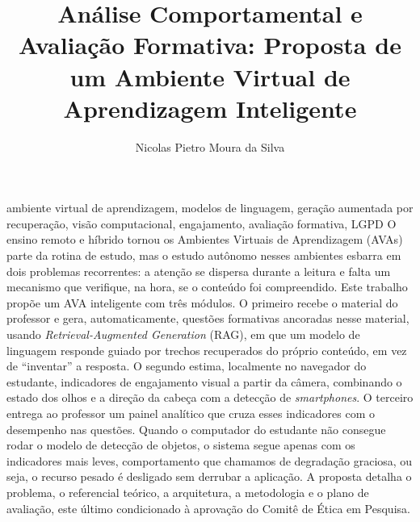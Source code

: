 \documentclass[portuguese,oneside]{tcc}
\author{Nicolas Pietro Moura da Silva}
\title{Análise Comportamental e Avaliação Formativa: Proposta de um Ambiente Virtual de Aprendizagem Inteligente}
      {Behavioural Analysis and Formative Assessment: A Proposal for an Intelligent Virtual Learning Environment}
\begin{document}

\begin{resumo}{ambiente virtual de aprendizagem, modelos de linguagem, geração aumentada por recuperação, visão computacional, engajamento, avaliação formativa, LGPD}
O ensino remoto e híbrido tornou os Ambientes Virtuais de Aprendizagem (AVAs) parte da rotina de estudo, mas o estudo autônomo nesses ambientes esbarra em dois problemas recorrentes: a atenção se dispersa durante a leitura e falta um mecanismo que verifique, na hora, se o conteúdo foi compreendido. Este trabalho propõe um AVA inteligente com três módulos. O primeiro recebe o material do professor e gera, automaticamente, questões formativas ancoradas nesse material, usando \emph{Retrieval-Augmented Generation} (RAG), em que um modelo de linguagem responde guiado por trechos recuperados do próprio conteúdo, em vez de ``inventar'' a resposta. O segundo estima, localmente no navegador do estudante, indicadores de engajamento visual a partir da câmera, combinando o estado dos olhos e a direção da cabeça com a detecção de \emph{smartphones}. O terceiro entrega ao professor um painel analítico que cruza esses indicadores com o desempenho nas questões. Quando o computador do estudante não consegue rodar o modelo de detecção de objetos, o sistema segue apenas com os indicadores mais leves, comportamento que chamamos de degradação graciosa, ou seja, o recurso pesado é desligado sem derrubar a aplicação. A proposta detalha o problema, o referencial teórico, a arquitetura, a metodologia e o plano de avaliação, este último condicionado à aprovação do Comitê de Ética em Pesquisa.
\end{resumo}
\end{document}

